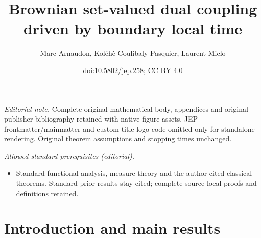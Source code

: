\documentclass[10pt]{amsart}
\title{Brownian set-valued dual coupling driven by boundary local time}
\author{Marc Arnaudon, Koléhè Coulibaly-Pasquier, Laurent Miclo}
\date{doi:10.5802/jep.258; CC BY 4.0}
\theoremstyle{plain}
\theoremstyle{definition}
\begin{document}
\maketitle
\noindent\textit{Editorial note.} Complete original mathematical body, appendices and original publisher bibliography retained with native figure assets. JEP frontmatter/mainmatter and custom title-logo code omitted only for standalone rendering. Original theorem assumptions and stopping times unchanged.\par\medskip
\noindent\textit{Allowed standard prerequisites (editorial).}\begin{itemize}
\item Standard functional analysis, measure theory and the author-cited classical theorems. Standard prior results stay cited; complete source-local proofs and definitions retained.
\end{itemize}\medskip
\vspace*{-\baselineskip}
\tableofcontents


\section{Introduction and main results}
\label{Section0}
\end{document}
